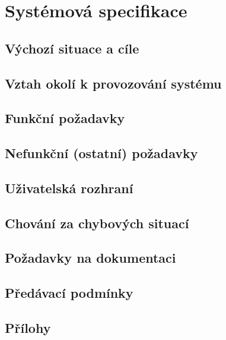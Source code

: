 \chapter{Systémová specifikace}

\section{Výchozí situace a cíle}
\section{Vztah okolí k provozování systému}
\section{Funkční požadavky}
\section{Nefunkční (ostatní) požadavky}
\section{Uživatelská rozhraní}
\section{Chování za chybových situací}
\section{Požadavky na dokumentaci}
\section{Předávací podmínky}
\section{Přílohy}


\endinput

